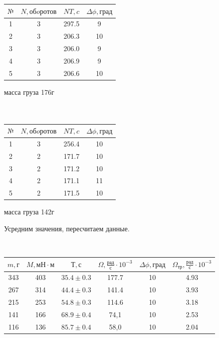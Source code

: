 \documentclass{article}
\begin{document}
\begin{center}
\begin{minipage}{0.4\textwidth}
\begin{center}
\end{center}
\end{minipage}
\begin{minipage}{0.4\textwidth}
\begin{tabular}{|c|c|c|c|}
\hline
 $№$ & $N, обoротов$ & $NT, c$ & $\Delta \phi, град$ \\
\hline 
 1 & 3 & 297.5 &  9\\
\hline
 2 & 3 & 206.3 & 10\\
\hline 
 3 & 3 & 206.0 &  9\\
\hline
 4 & 3 & 206.9 & 9\\
\hline
 5 & 3 & 206.6 & 10\\
\hline
\end{tabular}
\begin{center}
\caption{масса груза 176г}
\end{center}
\end{minipage}
\\
\begin{align*}
\end{align*}
\begin{minipage}{0.4\textwidth}
\begin{tabular}{|c|c|c|c|}
\hline
 $№$ & $N, обoротов$ & $NT, c$ & $\Delta \phi, град$ \\
\hline 
 1 & 3 & 256.4 & 10\\
\hline
 2 & 2 & 171.7 & 10 \\
\hline 
 3 & 2 & 171.2 & 10\\
\hline
 4 & 2 & 171.1 & 11\\
\hline
 5 & 2 & 171.5 & 10\\
\hline
\end{tabular}
\begin{center}
\caption{масса груза 142г}
\end{center}
\end{minipage}

\begin{center}
\caption{Усредним значения, пересчитаем данные.}
\end{center}
\\


\begin{center}
\begin{tabular}{|c|c|c|c|c|c|}
\hline
 $m, г$ &$M, мН \cdot м$ & $Т, с$ & $\Omega, \frac{рад}{с}\cdot 10^{-3} $ & $\Delta \phi, град$ & $\Omega_{тр}, \frac{рад}{с} \cdot 10^{-3}$ \\
\hline 
 343 & 403 & $35.4\pm0.3$ & 177.7 & 10 & 4.93 \\
\hline
 267 & 314 & $44.4\pm0.3$ & 141.4 & 10 & 3.93 \\
\hline 
 215 & 253 & $54.8\pm0.3$ & 114.6 & 10 & 3.18 \\
\hline
 141 & 166 & $68.9\pm0.4$ & 74,1 & 10 & 2.53 \\
\hline
 116 & 136 & $85.7\pm0.4$ & 58,0 & 10 & 2.04 \\
\hline
\end{tabular}
\end{center}


\end{center}
\end{document}
